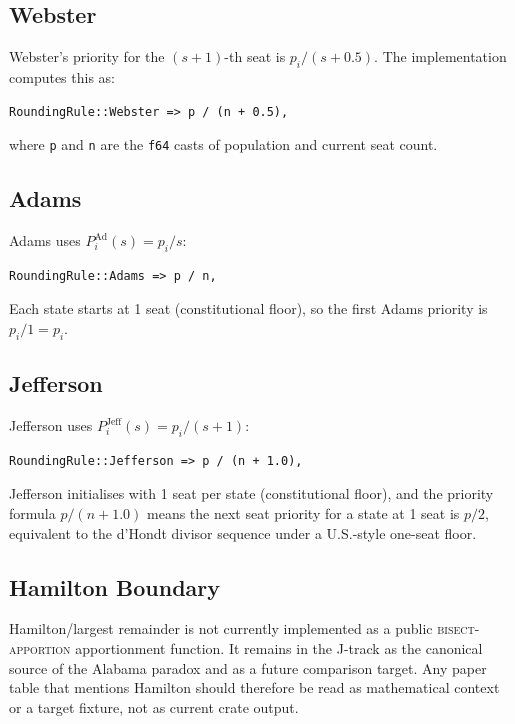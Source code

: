 \label{sec:other-methods}

\subsection{Webster}

Webster's priority for the $(s+1)$-th seat is $p_i/(s+0.5)$.
The implementation computes this as:

\begin{verbatim}
RoundingRule::Webster => p / (n + 0.5),
\end{verbatim}

where \texttt{p} and \texttt{n} are the \texttt{f64} casts of population
and current seat count.

\subsection{Adams}

Adams uses $P_i^{\text{Ad}}(s) = p_i/s$:

\begin{verbatim}
RoundingRule::Adams => p / n,
\end{verbatim}

Each state starts at 1 seat (constitutional floor), so the first
Adams priority is $p_i/1 = p_i$.

\subsection{Jefferson}

Jefferson uses $P_i^{\text{Jeff}}(s) = p_i/(s+1)$:

\begin{verbatim}
RoundingRule::Jefferson => p / (n + 1.0),
\end{verbatim}

Jefferson initialises with 1 seat per state (constitutional floor),
and the priority formula $p/(n+1.0)$ means the next seat priority
for a state at 1 seat is $p/2$, equivalent to the d'Hondt divisor sequence
under a U.S.-style one-seat floor.

\subsection{Hamilton Boundary}

Hamilton/largest remainder is not currently implemented as a public
\textsc{bisect-apportion} apportionment function.  It remains in the J-track as
the canonical source of the Alabama paradox and as a future comparison target.
Any paper table that mentions Hamilton should therefore be read as mathematical
context or a target fixture, not as current crate output.

